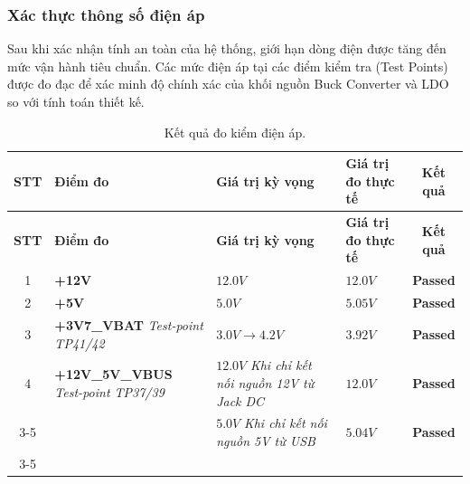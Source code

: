         \subsubsection{Xác thực thông số điện áp}
            Sau khi xác nhận tính an toàn của hệ thống, giới hạn dòng điện được tăng đến mức vận hành tiêu chuẩn. Các mức điện áp tại các điểm kiểm tra (Test Points) được đo đạc để xác minh độ chính xác của khối nguồn Buck Converter và LDO so với tính toán thiết kế.

            \begin{longtable}{|c|p{}|p{}|p{}|c|}
                \caption{Kết quả đo kiểm điện áp.}
                \label{tab:voltage_validation_final} \\
                \hline
                \textbf{STT} & \textbf{Điểm đo} & \textbf{Giá trị kỳ vọng} & \textbf{Giá trị đo thực tế} & \textbf{Kết quả} \\ \hline
                \endfirsthead
                \hline
                \textbf{STT} & \textbf{Điểm đo} & \textbf{Giá trị kỳ vọng} & \textbf{Giá trị đo thực tế} & \textbf{Kết quả} \\ \hline
                \endhead
                \hline
                \endfoot
                \endlastfoot

                1 & \textbf{+12V} & $12.0 V$ & $12.0 V$ & \textcolor{modern_blue}{\textbf{Passed}} \\ \hline

                2 & \textbf{+5V} & $5.0 V$ & $5.05 V$ & \textcolor{modern_blue}{\textbf{Passed}} \\ \hline
                
                3 & \textbf{+3V7\_VBAT} \newline \textit{Test-point TP41/42} & $3.0 V \rightarrow 4.2 V$ & $3.92 V$ & \textcolor{modern_blue}{\textbf{Passed}} \\ \hline
                
                4 & \textbf{+12V\_5V\_VBUS} \newline \textit{Test-point TP37/39} & $12.0 V$ \newline \textit{Khi chỉ kết nối nguồn 12V từ Jack DC} & $12.0 V$ & \textcolor{modern_blue}{\textbf{Passed}} \\ \cline{3-5}
                
                &  &  $5.0 V$ \newline \textit{Khi chỉ kết nối nguồn 5V từ USB} & $5.04 V$ & \textcolor{modern_blue}{\textbf{Passed}} \\ \cline{3-5}
                

\end{longtable}
